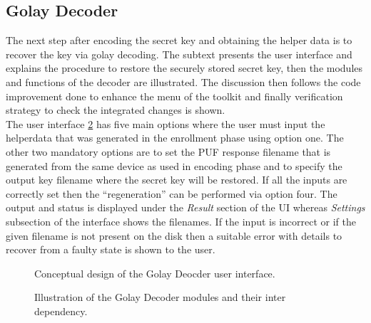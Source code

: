 \subsection{Golay Decoder}
The next step after encoding the secret key and obtaining the helper data is to recover the key via golay decoding. The subtext presents the user interface and explains the procedure to restore the securely stored secret key, then the modules and functions of the decoder are illustrated. The discussion then follows the code improvement done to enhance the menu of the toolkit and finally verification strategy to check the integrated changes is shown.\\

The user interface \ref{img:golay_decoder_ui} has five main options where the user must input the helperdata that was generated in the enrollment phase using option one. The other two mandatory options are to set the PUF response filename that is generated from the same device as used in encoding phase and to specify the output key filename where the secret key will be restored. If all the inputs are correctly set then the ``regeneration'' can be performed via option four. The output and status is displayed
under the \emph{Result} section of the UI whereas \emph{Settings} subsection of the interface shows the filenames. If the input is incorrect or if the given filename is not present on the disk then a suitable error with details to recover from a faulty state is shown to the user.\\
\begin{figure}
\centering
{}
\caption{Conceptual design of the Golay Deocder user interface.}
\label{img:golay_decoder_ui}
\end{figure}

\begin{figure}
\centering
{}
\caption{Illustration of the Golay Decoder modules and their inter dependency.}
\label{img:golay_decoder_ui}
\end{figure}

